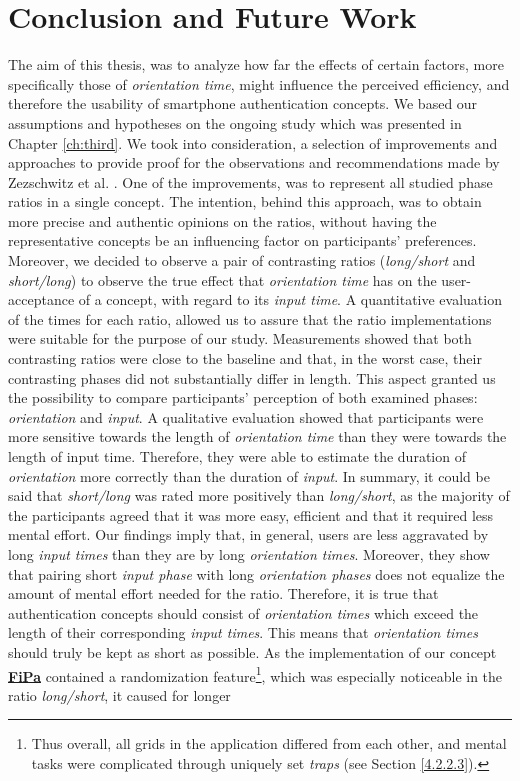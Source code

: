
\chapter{Conclusion and Future Work}\label{ch:seventh}

The aim of this thesis, was to analyze how far the effects of certain factors, more specifically those of \textit{orientation time}, might influence the perceived efficiency, and therefore the usability of smartphone authentication concepts. We based our assumptions and hypotheses on the ongoing study which was presented in Chapter \ref{ch:third}. We took into consideration, a selection of improvements and approaches to provide proof for the observations and recommendations made by Zezschwitz et al. \cite{Zezschwitz}. One of the improvements, was to represent all studied phase ratios in a single concept. The intention, behind this approach, was to obtain more precise and authentic opinions on the ratios, without having the representative concepts be an influencing factor on participants' preferences. Moreover, we decided to observe a pair of contrasting ratios (\textit{long/short} and \textit{short/long}) to observe the true effect that \textit{orientation time} has on the user-acceptance of a concept, with regard to its \textit{input time}. A quantitative evaluation of the times for each ratio, allowed us to assure that the ratio implementations were suitable for the purpose of our study. Measurements showed that both contrasting ratios were close to the baseline and that, in the worst case, their contrasting phases did not substantially differ in length. This aspect granted us the possibility to compare participants' perception of both examined phases: \textit{orientation} and \textit{input}. A qualitative evaluation showed that participants were more sensitive towards the length of \textit{orientation time} than they were towards the length of input time. Therefore, they were able to estimate the duration of \textit{orientation} more correctly than the duration of \textit{input}. In summary, it could be said that \textit{short/long} was rated more positively than \textit{long/short}, as the majority of the participants agreed that it was more easy, efficient and that it required less mental effort. Our findings imply that, in general, users are less aggravated by long \textit{input times} than they are by long \textit{orientation times}. Moreover, they show that pairing short \textit{input phase} with long \textit{orientation phases} does not equalize the amount of mental effort needed for the ratio. Therefore, it is true that authentication concepts should consist of \textit{orientation times} which exceed the length of their corresponding \textit{input times}. This means that \textit{orientation times} should truly be kept as short as possible. As the implementation of our concept \underline{\textbf{FiPa}} contained a randomization feature\footnote{Thus overall, all grids in the application differed from each other, and mental tasks were complicated through uniquely set \textit{traps} (see Section \ref{4.2.2.3}).}, which was especially noticeable in the ratio \textit{long/short}, it caused for longer 